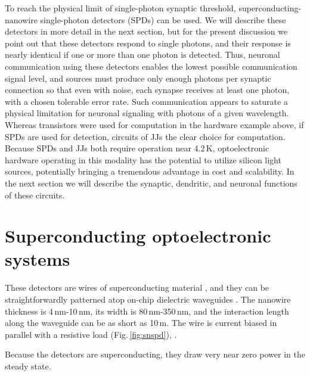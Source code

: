 \documentclass[twocolumn]{article}
\begin{document}
To reach the physical limit of single-photon synaptic threshold, superconducting-nanowire single-photon detectors (SPDs) can be used. We will describe these detectors in more detail in the next section, but for the present discussion we point out that these detectors respond to single photons, and their response is nearly identical \cite{} if one or more than one photon is detected. Thus, neuronal communication using these detectors enables the lowest possible communication signal level, and sources must produce only enough photons per synaptic connection so that even with noise, each synapse receives at least one photon, with a chosen tolerable error rate. Such communication appears to saturate a physical limitation for neuronal signaling with photons of a given wavelength. Whereas transistors were used for computation in the hardware example above, if SPDs are used for detection, circuits of JJs the clear choice for computation. Because SPDs and JJs both require operation near 4.2\,K, optoelectronic hardware operating in this modality has the potential to utilize silicon light sources, potentially bringing a tremendous advantage in cost and scalability. In the next section we will describe the synaptic, dendritic, and neuronal functions of these circuits. 

\section{\label{sec:superconductingOptoelectronic}Superconducting optoelectronic systems}


These detectors are wires of superconducting material \cite{mave2013}, and they can be straightforwardly patterned atop on-chip dielectric waveguides \cite{shbu2017b,x,y,z}. The nanowire thickness is 4\,nm-10\,nm, its width is 80\,nm-350\,nm, and the interaction length along the waveguide can be as short as 10\,\textmu m. The wire is current biased in parallel with a resistive load (Fig.\,\ref{fig:snspd}), .

Because the detectors are superconducting, they draw very near zero power in the steady state. 
\end{document}
